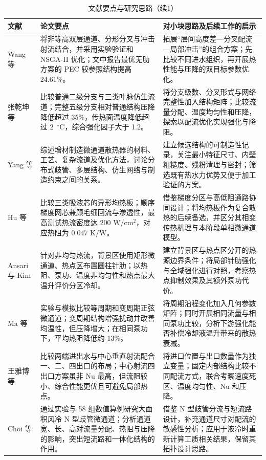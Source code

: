 \documentclass[stage1,fontset=fandol]{ydzjreport}
\begin{document}
\begin{table}[H]
	  \centering
	  \small
	  \renewcommand{\arraystretch}{1.12}
	  \caption{文献要点与研究思路（续1）}
	  \label{tab:notes-cont-2}
	  \begin{tabularx}{\textwidth}{@{}>{\RaggedRight\arraybackslash}p{} Y Y@{}}
	    \toprule
{} 文献 & 论文要点 & 对小块思路及后续工作的启示 \\
	    \midrule
	    Wang 等\cite{ref5} & 将非等高双层通道、分形分叉与冲击射流结合，并采用实验验证和 NSGA-II 优化；文中报告最优无肋方案的 PEC 较参照结构提高 24.61\%。 & 拓展“层间高度差—分叉配流—局部冲击”的组合方案；先比较不同进水组织，再开展热性能与压降的双目标参数优化。 \\[3pt]
	    张乾坤等\cite{ref6} & 比较普通二级分支与三类叶脉仿生流道；完整五级分支相对普通结构压降降低超过 35\%，传热面温度降低超过 2 $\,{}^\circ\mathrm{C}$，综合强化因子大于 1.2。 & 将分支级数、分叉形式与网络完整性加入结构矩阵；比较流量分配、温度均匀性和压降，探索以配流优化实现强化与降阻。 \\[3pt]
	    Yang 等\cite{ref7} & 综述增材制造微通道散热器的材料、工艺、复杂流道及优化方法，讨论分布式歧管、多层结构、仿生网络与制造约束之间的关系。 & 建立候选结构的可制造性记录，关注最小特征尺寸、内壁粗糙度、残粉清理与密封；筛选既有热水力优势又便于加工验证的方案。 \\[3pt]
	    Hu 等\cite{ref8} & 比较三类吸液芯的异形均热板；顺序梯度网芯兼顾毛细回流与渗透性，最高测试热流密度达 200 W/cm$^2$，对应热阻为 0.047 K/W。 & 借鉴梯度分区与高低阻通路协同设计；将均热板作为复合散热的后续备选，并区分其相变传热机理与本阶段单相微通道模型。 \\[3pt]


	    Ansari 与 Kim\cite{ref13} & 针对非均匀热流，背景区使用矩形微通道、热点区布置圆柱针肋；以热阻、泵功、温度非均匀性和热点最大温升评价分区冷却。 & 建立背景区与热点区分开的热源边界条件；将局部针肋强化与全域强化进行对照，考察热点抑制效果及其额外泵功代价。 \\[3pt]

	    Ma 等\cite{ref15} & 实验与模拟比较等周期和变周期正弦微通道；变周期结构增强扰动并改善均温性，但压降增大；在相同泵功下，平均热阻降低约 13\%。 & 将周期沿程变化加入几何参数矩阵；同时开展相同流量与相同泵功比较，分析下游强化能否补偿冷却液温升带来的散热衰减。 \\[3pt]

	    王雅博等\cite{ref16} & 比较两端进出水与中心垂直射流配合一、二、四出口的布局；中心射流四出口方案虽非 Nu 最高，但流阻较小、综合性能更优且可避免局部热点。 & 将进口位置与出口数量作为独立变量；固定内部结构比较不同配流方式，联合考察速度死区、温度均匀性、Nu 和压降。 \\[3pt]

	    Choi 等\cite{ref17} & 通过实验与 58 组数值算例研究大面积风冷 N 型歧管微通道；分析通道宽、长、高对流量分配、热阻与压降的影响，突出短流路和一体化结构的作用。 & 借鉴 N 型歧管分流与短流路设计，补充通道尺寸对配流的敏感性分析；应用于液冷时重新计算工质相关结果，保留其拓扑设计思路。 \\[3pt]
	    \bottomrule
	  \end{tabularx}
	\end{table}
\end{document}
